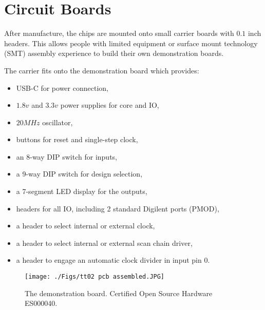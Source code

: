 \section{Circuit Boards}
\label{sec:circuit_board}
After manufacture, the chips are mounted onto small carrier boards with \(0.1\) inch headers. This allows people with limited equipment or surface mount technology (SMT) assembly experience to build their own demonstration boards.

The carrier fits onto the demonstration board which provides:
\begin{itemize}
\item USB-C for power connection,
\item \(1.8v\) and \(3.3v\) power supplies for core and IO,
\item \(20MHz\) oscillator,
\item buttons for reset and single-step clock,
\item an 8-way DIP switch for inputs,
\item a 9-way DIP switch for design selection,
\item a 7-segment LED display for the outputs,
\item headers for all IO, including 2 standard Digilent ports (PMOD),
\item a header to select internal or external clock,
\item a header to select internal or external scan chain driver,
\item a header to engage an automatic clock divider in input pin 0.
\end{itemize}

\begin{figure}[htp]
\centering
\texttt{[image: ./Figs/tt02 pcb assembled.JPG]}
\caption{The demonstration board. Certified Open Source Hardware ES000040\cite{oshwacertification}.}
\label{fig:demonstration_board}
\end{figure}
